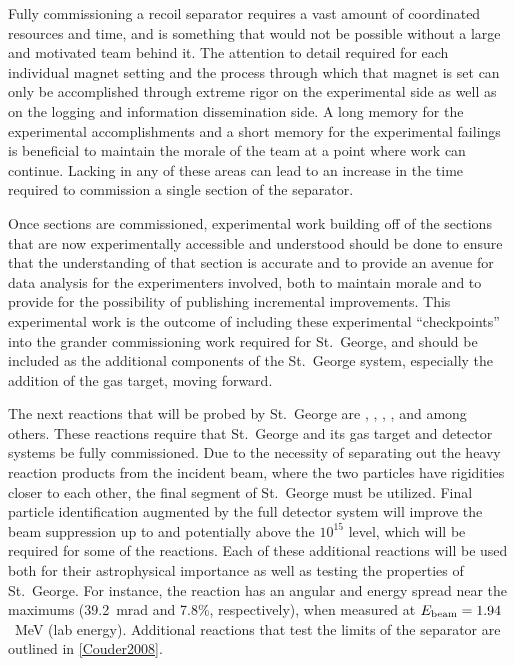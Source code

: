 Fully commissioning a recoil separator requires a vast amount of
coordinated resources and time, and is something that would not be
possible without a large and motivated team behind it. The attention to
detail required for each individual magnet setting and the process
through which that magnet is set can only be accomplished through
extreme rigor on the experimental side as well as on the logging and
information dissemination side. A long memory for the experimental
accomplishments and a short memory for the experimental failings is
beneficial to maintain the morale of the team at a point where work can
continue. Lacking in any of these areas can lead to an increase in the
time required to commission a single section of the separator.

Once sections are commissioned, experimental work building off of the
sections that are now experimentally accessible and understood should be
done to ensure that the understanding of that section is accurate and to
provide an avenue for data analysis for the experimenters involved, both
to maintain morale and to provide for the possibility of publishing
incremental improvements. This experimental work is the outcome of
including these experimental ``checkpoints'' into the grander
commissioning work required for St.\ George, and should be included as
the additional components of the St.\ George system, especially the
addition of the gas target, moving forward.

The next reactions that will be probed by St.\ George are
,
,
,
, and
 among others. These
reactions require that St.\ George and its gas target and detector
systems be fully commissioned. Due to the necessity of separating out
the heavy reaction products from the incident beam, where the two
particles have rigidities closer to each other, the final segment of
St.\ George must be utilized. Final particle identification augmented by
the full detector system will improve the beam suppression up to and
potentially above the $10^{15}$ level, which will be required for some
of the reactions. Each of these additional reactions will be used both
for their astrophysical importance as well as testing the properties of
St.\ George. For instance, the reaction
 has an angular and
energy spread near the maximums (39.2~mrad and 7.8\%, respectively),
when measured at $E_{\rm beam} = 1.94$~MeV (lab energy). Additional
reactions that test the limits of the separator are outlined in
\ref{Couder2008}.

